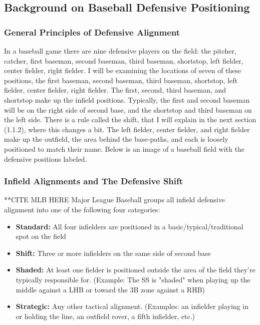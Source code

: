 \documentclass{article}
\begin{document}
\subsection{Background on Baseball Defensive Positioning}
\subsubsection{General Principles of Defensive Alignment}
In a baseball game there are nine defensive players on the field: the pitcher, catcher, first baseman, second baseman, third baseman, shortstop, left fielder, center fielder, right fielder. I will be examining the locations of seven of these positions, the first baseman, second baseman, third baseman, shortstop, left fielder, center fielder, right fielder. The first, second, third baseman, and shortstop make up the infield positions. Typically, the first and second baseman will be on the right side of second base, and the shortstop and third baseman on the left side. There is a rule called the shift, that I will explain in the next section (1.1.2), where this changes a bit. The left fielder, center fielder, and right fielder make up the outfield, the area behind the base-paths, and each is loosely positioned to match their name. Below is an image of a baseball field with the defensive positions labeled. 


\subsubsection{Infield Alignments and The Defensive Shift}
**CITE MLB HERE 
Major League Baseball groups all infield defensive alignment into one of the following four categories:

\begin{itemize}
    \item \textbf{Standard:} All four infielders are positioned in a basic/typical/traditional spot on the field
    \item \textbf{Shift:} Three or more infielders on the same side of second base
    \item \textbf{Shaded:} At least one fielder is positioned outside the area of the field they're typically responsible for. (Example: The SS is "shaded" when playing up the middle against a LHB or toward the 3B zone against a RHB)
    \item \textbf{Strategic:} Any other tactical alignment. (Examples: an infielder playing in or holding the line, an outfield rover, a fifth infielder, etc.)
\end{itemize}
\end{document}
